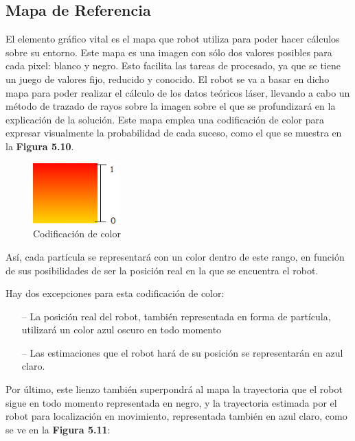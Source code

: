\begin{enumerate}
\end{enumerate}

\subsection{Mapa de Referencia}
El elemento gráfico vital es el mapa que robot utiliza para poder hacer cálculos sobre su entorno. Este mapa es una imagen con sólo dos valores posibles para cada pixel: blanco y negro. Esto facilita las tareas de procesado, ya que se tiene un juego de valores fijo, reducido y conocido. El robot se va a basar en dicho mapa para poder realizar el cálculo de los datos teóricos láser, llevando a cabo un método de trazado de rayos sobre la imagen sobre el que se profundizará en la explicación de la solución. Este mapa emplea una codificación de color para expresar visualmente la probabilidad de cada suceso, como el que se muestra en la \textbf{Figura 5.10}.

\begin{multicols}{2}
\begin{figure}[H]
		\begin{center}
			\includegraphics[width=0.3\textwidth]{figures/gradcolor.png}
			\caption{Codificación de color}
			\label{fig.gradcolor}
			\end{center}
	\end{figure}

Así, cada partícula se representará con un color dentro de este rango, en función de sus posibilidades de ser la posición real en la que se encuentra el robot.

Hay dos excepciones para esta codificación de color:
\end{multicols} 

\begin{itemize}
	\item[--] La posición real del robot, también representada en forma de partícula, utilizará un color azul oscuro en todo momento
	\item[--] Las estimaciones que el robot hará de su posición se representarán en azul claro.
\end{itemize}

Por último, este lienzo también superpondrá al mapa la trayectoria que el robot sigue en todo momento representada en negro, y la trayectoria estimada por el robot para localización en movimiento, representada también en azul claro, como se ve en la \textbf{Figura 5.11}:

